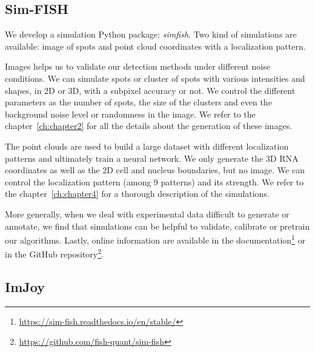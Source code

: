 \subsection{Sim-FISH}
\label{subsec:simfish}

We develop a simulation Python package: \emph{simfish}.
Two kind of simulations are available: image of spots and point cloud coordinates with a localization pattern.

Images helps us to validate our detection methods under different noise conditions.
We can simulate spots or cluster of spots with various intensities and shapes, in 2D or 3D, with a subpixel accuracy or not.
We control the different parameters as the number of spots, the size of the clusters and even the background noise level or randomness in the image.
We refer to the chapter~\ref{ch:chapter2} for all the details about the generation of these images.

The point clouds are used to build a large dataset with different localization patterns and ultimately train a neural network.
We only generate the 3D \ac{RNA} coordinates as well as the 2D cell and nucleus boundaries, but no image.
We can control the localization pattern (among 9 patterns) and its strength.
We refer to the chapter~\ref{ch:chapter4} for a thorough description of the simulations.

More generally, when we deal with experimental data difficult to generate or annotate, we find that simulations can be helpful to validate, calibrate or pretrain our algorithms.
Lastly, online information are available in the documentation\footnote{\url{https://sim-fish.readthedocs.io/en/stable/}} or in the GitHub repository\footnote{\url{https://github.com/fish-quant/sim-fish}}.

\subsection{ImJoy}
\label{subsec:imjoy}

